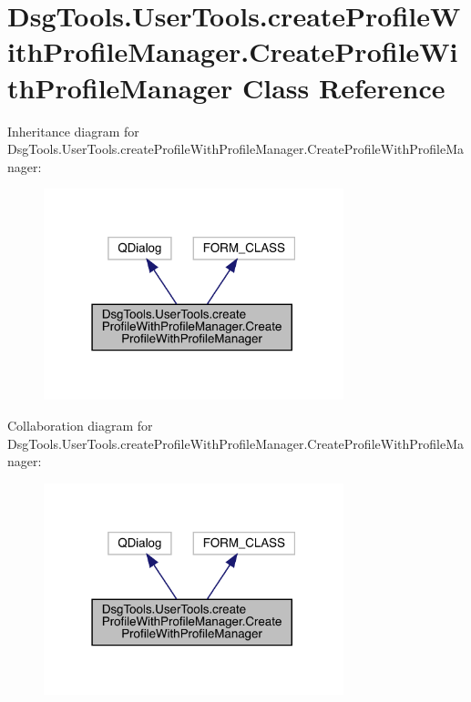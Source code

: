 \hypertarget{class_dsg_tools_1_1_user_tools_1_1create_profile_with_profile_manager_1_1_create_profile_with_profile_manager}{}\section{Dsg\+Tools.\+User\+Tools.\+create\+Profile\+With\+Profile\+Manager.\+Create\+Profile\+With\+Profile\+Manager Class Reference}
\label{class_dsg_tools_1_1_user_tools_1_1create_profile_with_profile_manager_1_1_create_profile_with_profile_manager}


Inheritance diagram for Dsg\+Tools.\+User\+Tools.\+create\+Profile\+With\+Profile\+Manager.\+Create\+Profile\+With\+Profile\+Manager\+:
\nopagebreak
\begin{figure}[H]
\begin{center}
\leavevmode
\includegraphics[width=247pt]{class_dsg_tools_1_1_user_tools_1_1create_profile_with_profile_manager_1_1_create_profile_with_profile_manager__inherit__graph}
\end{center}
\end{figure}


Collaboration diagram for Dsg\+Tools.\+User\+Tools.\+create\+Profile\+With\+Profile\+Manager.\+Create\+Profile\+With\+Profile\+Manager\+:
\nopagebreak
\begin{figure}[H]
\begin{center}
\leavevmode
\includegraphics[width=247pt]{class_dsg_tools_1_1_user_tools_1_1create_profile_with_profile_manager_1_1_create_profile_with_profile_manager__coll__graph}
\end{center}
\end{figure}
